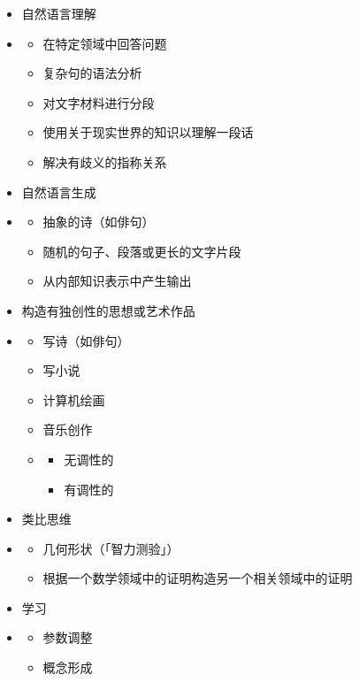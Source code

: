 \documentclass[
  12pt,
  twoside,
  openright,
  oldfontcommands,
]{memoir}
\providecommand{\tightlist}{%
  \setlength{\itemsep}{0pt}\setlength{\parskip}{0pt}}
\begin{document}
\begin{itemize}
\begin{itemize}
\begin{itemize}
    \end{itemize}
  \end{itemize}
\item
  自然语言理解
\item
  \begin{itemize}
  \tightlist
  \item
    在特定领域中回答问题
  \item
    复杂句的语法分析
  \item
    对文字材料进行分段
  \item
    使用关于现实世界的知识以理解一段话
  \item
    解决有歧义的指称关系
  \end{itemize}
\item
  自然语言生成
\item
  \begin{itemize}
  \tightlist
  \item
    抽象的诗（如俳句）
  \item
    随机的句子、段落或更长的文字片段
  \item
    从内部知识表示中产生输出
  \end{itemize}
\item
  构造有独创性的思想或艺术作品
\item
  \begin{itemize}
  \tightlist
  \item
    写诗（如俳句）
  \item
    写小说
  \item
    计算机绘画
  \item
    音乐创作
  \item
    \begin{itemize}
    \tightlist
    \item
      无调性的
    \item
      有调性的
    \end{itemize}
  \end{itemize}
\item
  类比思维
\item
  \begin{itemize}
  \tightlist
  \item
    几何形状（「智力测验」）
  \item
    根据一个数学领域中的证明构造另一个相关领域中的证明
  \end{itemize}
\item
  学习
\item
  \begin{itemize}
  \tightlist
  \item
    参数调整
  \item
    概念形成
  \end{itemize}
\end{itemize}
\end{document}
